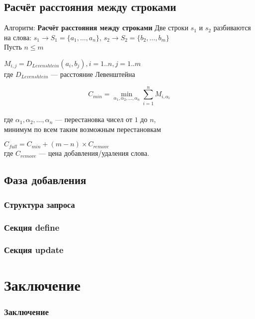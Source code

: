 \documentclass[utf8,handout]{beamer}
\begin{document}
	\subsection{Расчёт расстояния между строками}
	\begin{frame}
 		\begin{block}{Алгоритм: \textbf{Расчёт расстояния между строками}}
 			Две строки $s_{1}$ и $s_{2}$ разбиваются на слова:
 			$s_{1}\rightarrow S_{1}=\lbrace a_{1},\ldots,a_{n}\rbrace$, $s_{2}\rightarrow S_{2}=\lbrace b_{2},\ldots,b_{m}\rbrace$ \\
 			Пусть $n\leq m$

			$ M_{i,j} = D_{Levenshtein}(a_{i},b_{j}), i=1..n, j=1..m $ \\
			где $D_{Levenshtein}$ --- расстояние Левенштейна
			
			\[	C_{min}=\min_{\alpha_1, \alpha_2, \ldots, \alpha_n}{\sum_{i=1}^{n} M_{i,\alpha_{i}}} \] \\
			где $\alpha_1, \alpha_2, \ldots, \alpha_n$ --- перестановка чисел от $1$ до $n$,\\
			минимум по всем таким возможным перестановкам

			$C_{full}=C_{min}+(m-n)\times C_{remove}$\\
			где $C_{remove}$ --- цена добавления/удаления слова.
		\end{block}
	\end{frame}

	\subsection{Фаза добавления}
		\begin{frame}
 			\frametitle{Структура запроса}
		\end{frame}
	
		\begin{frame}
 			\frametitle{Секция define}
		\end{frame}
	
		\begin{frame}
 			\frametitle{Секция update}
		\end{frame}
	
\section{Заключение}
	\begin{frame}
		\frametitle{Заключение}
	\end{frame}
	
\end{document}
